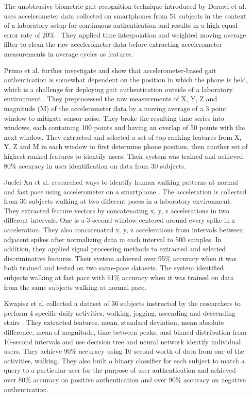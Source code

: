 \documentclass{soups}
\begin{document}
The unobtrusive biometric gait recognition technique introduced by Derawi et al. uses accelerometer data collected on smartphones from 51 subjects in the context of a laboratory setup for continuous authentication and results in a high equal error rate of 20\% \cite{derawi:gait}. 
They applied time interpolation and weighted moving average filter to clean the raw accelerometer data before extracting accelerometer measurements in average cycles as features.

Primo et al. further investigate and show that accelerometer-based gait authentication is somewhat dependent on the position in which the phone is held, which is a challenge for deploying gait authentication outside of a laboratory environment \cite{primo:context}. 
They preprocessed the raw measurements of X, Y, Z and magnitude (M) of the accelerometer data by a moving average of a 3 point window to mitigate sensor noise. 
They broke the resulting time series into windows, each containing 100 points and having an overlap of 50 points with the next window. 
They extracted and selected a set of top ranking features from X, Y, Z and M in each window to first determine phone position, then another set of highest ranked features to identify users. 
Their system was trained and achieved 80\% accuracy in user identification on data from 30 subjects.

Juefei-Xu et al. researched ways to identify human walking patterns at normal and fast pace using accelerometer on a smartphone \cite{xu:pace}. 
The acceleration is collected from 36 subjects walking at two different paces in a laboratory environment. 
They extracted feature vectors by concatenating x, y, z accelerations in two different intervals. 
One is a 3-second window centered around every spike in z acceleration. 
They also concatenated x, y, z accelerations from intervals between adjacent spikes after normalizing data in each interval to 500 samples. 
In addition, they applied signal processing methods to extracted and selected discriminative features. 
Their system achieved over 95\% accuracy when it was both trained and tested on two same-pace datasets. 
The system identified subjects walking at fast pace with 61\% accuracy when it was trained on data from the same subjects walking at normal pace.

Kwapisz et al collected a dataset of 36 subjects instructed by the researchers to perform 4 specific daily activities, walking, jogging, ascending and descending stairs \cite{kwapisz:biometrics}. 
They extracted features, mean, standard deviation, mean absolute difference, mean of magnitude, time between peaks, and binned distribution from 10-second intervals and use decision tree and neural network identify individual users. 
They achieve 90\% accuracy using 10 second worth of data from one of the activities, walking. 
They also built a binary classifier for each subject to match a query to a particular user for the purpose of user authentication and achieved over 80\% accuracy on positive authentication and over 90\% accuracy on negative authentication.
\end{document}
